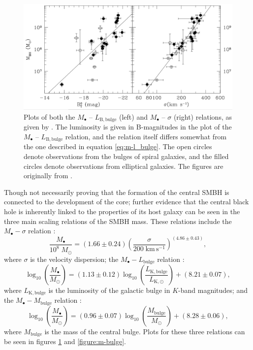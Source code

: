\documentclass[english, twoside]{HYgradu}
\begin{document}
\begin{figure}
	\centering
	\includegraphics[width=\textwidth]{ferrarese_m-sigma.png}
	\caption{Plots of both the $M_\bullet$ – $L_\mathrm{B,bulge}$ (left) and $M_\bullet$ – $\sigma$ (right) relations, as given by \cite{Ferrarese2005}. The luminosity is given in B-magnitudes in the plot of the $M_\bullet$ – $L_\mathrm{B,bulge}$ relation, and the relation itself differs somewhat from the one described in equation \ref{eq:m-l_bulge}. The open circles denote observations from the bulges of spiral galaxies, and the filled circles denote observations from elliptical galaxies. The figures are originally from \cite{Ferrarese2005}.}
	\label{figure:m-sigma}
\end{figure}

Though not necessarily proving that the formation of the central SMBH is connected to the development of the core; further evidence that the central black hole is inherently linked to the properties of its host galaxy can be seen in the three main scaling relations of the SMBH mass. These relations include the $M_\bullet - \sigma$ relation \citep{Ferrarese2005}:
\begin{equation}
\frac{M_\bullet}{10^8 \; M_\odot} = (1.66 \pm 0.24) \left( \frac{\sigma}{200 \; \mathrm{km \, s^{-1}}} \right)^{(4.86\pm0.43)}, \label{eq:m-sigma}
\end{equation}
where $\sigma$ is the velocity dispersion; the $M_\bullet - L_\mathrm{bulge}$ relation \citep{Marconi2003}:
\begin{equation}
\log_{10} \left( \frac{M_\bullet}{M_\odot} \right) = (1.13 \pm 0.12) \log_{10} \left( \frac{L_\mathrm{K,bulge}}{L_\mathrm{K,\odot}} \right) + (8.21 \pm 0.07), \label{eq:m-l_bulge}
\end{equation}
where $L_\mathrm{K,bulge}$ is the luminosity of the galactic bulge in $K$-band magnitudes; and the $M_\bullet - M_\mathrm{bulge}$ relation \citep{Marconi2003}:
\begin{equation}
\log_{10} \left( \frac{M_\bullet}{M_\odot} \right) = (0.96 \pm 0.07) \log_{10} \left( \frac{M_\mathrm{bulge}}{M_\odot} \right) + (8.28 \pm 0.06), \label{eq:m-m_bulge}
\end{equation}
where $M_\mathrm{bulge}$ is the mass of the central bulge. Plots for these three relations can be seen in figures \ref{figure:m-sigma} and \ref{figure:m-bulge}. 
\end{document}
